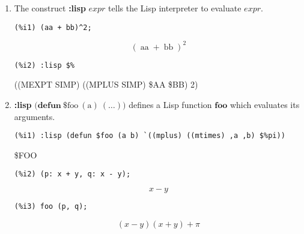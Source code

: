\documentclass[12pt,leqno]{article}
\begin{document}
\begin{enumerate}

\item The construct {\bf :lisp} $\mathit{expr}$ tells the Lisp interpreter
to evaluate $\mathit{expr}$.
\begin{verbatim}
(%i1) (aa + bb)^2;
\end{verbatim}
\begin{dmath}[number={\(\mathop{\mathrm{\%o}_{1}}\)}]
{\left(\mathop{\mathrm{aa}}+\mathop{\mathrm{bb}}\right)}^{2}
\end{dmath}
\begin{verbatim}
(%i2) :lisp $%
\end{verbatim}
((MEXPT SIMP) ((MPLUS SIMP) \$AA \$BB) 2)


\item {\bf :lisp} $\mathrm{(}\mathbf{defun\ } \mathrm{\$foo\ (a)\ (\ldots))}$
defines a Lisp function $\mathbf{foo}$ which evaluates its arguments.
\begin{verbatim}
(%i1) :lisp (defun $foo (a b) `((mplus) ((mtimes) ,a ,b) $%pi))
\end{verbatim}
\$FOO
\begin{verbatim}
(%i2) (p: x + y, q: x - y);
\end{verbatim}
\begin{dmath}[number={\(\mathop{\mathrm{\%o}_{2}}\)}]
x-y
\end{dmath}
\begin{verbatim}
(%i3) foo (p, q);
\end{verbatim}
\begin{dmath}[number={\(\mathop{\mathrm{\%o}_{3}}\)}]
\left(x-y\right) \left(x+y\right)+\pi
\end{dmath}



\end{enumerate}
\end{document}
